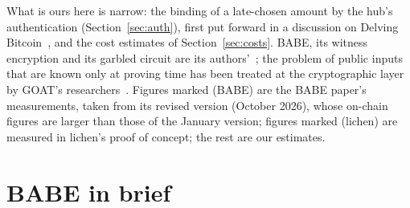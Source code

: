 \documentclass[11pt]{article}
\begin{document}
What is ours here is narrow: the binding of a late-chosen amount by the
hub's authentication (Section~\ref{sec:auth}), first put forward in a
discussion on Delving Bitcoin~\cite{delving}, and the cost estimates of
Section~\ref{sec:costs}. BABE, its witness encryption and its garbled
circuit are its authors'~\cite{babe,gkpw24,argo}; the problem of public
inputs that are known only at proving time has been treated at the
cryptographic layer by GOAT's researchers~\cite{goat}. Figures marked
(BABE) are the BABE paper's measurements, taken from its revised version
(October 2026), whose on-chain figures are larger than those of the
January version; figures marked (lichen) are measured in lichen's proof
of concept; the rest are our estimates.

\section{BABE in brief}
\label{sec:babe}
\end{document}
